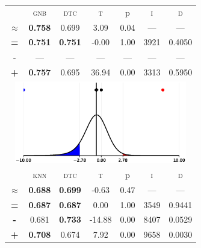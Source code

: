 \begin{tabular}{c||cc||c|c|c||c}
\midrule	&\textsc{gnb} & \textsc{dtc} & \textsc{t} & p & \textsc{i} & \textsc{d}\\
	\color{red} $\approx$ & \color{red} \bfseries 0.758 &\color{red}   0.699 & 3.09 & 0.04 & --- & ---\\\midrule
	{\bfseries\color{black}\tiny=}& \color{black} \bfseries 0.751 & \color{black} \bfseries 0.751 & -0.00 & 1.00 & 3921 & \color{black} 0.4050\\
	{\tiny-}& --- & --- & --- & --- & --- & ---\\
	{\bfseries\color{red}\tiny+}& \color{red} \bfseries 0.757 & \color{red}  0.695 & 36.94 & 0.00 & 3313 & \color{red} 0.5950\\
	\bottomrule
	\multicolumn{7}{c}{\includegraphics[width=7.5cm, trim=30 0 30 0]{figures/diabetes_2.eps}}\\

\midrule	&\textsc{knn} & \textsc{dtc} & \textsc{t} & p & \textsc{i} & \textsc{d}\\
	\color{black} $\approx$ & \color{black} \bfseries 0.688 &\color{black}  \bfseries 0.699 & -0.63 & 0.47 & --- & ---\\\midrule
	{\bfseries\color{black}\tiny=}& \color{black} \bfseries 0.687 & \color{black} \bfseries 0.687 & 0.00 & 1.00 & 3549 & \color{black} 0.9441\\
	{\bfseries\color{blue}\tiny-}& \color{blue}  0.681 & \color{blue} \bfseries 0.733 & -14.88 & 0.00 & 8407 & \color{blue} 0.0529\\
	{\bfseries\color{red}\tiny+}& \color{red} \bfseries 0.708 & \color{red}  0.674 & 7.92 & 0.00 & 9658 & \color{red} 0.0030\\
\bottomrule\end{tabular}



